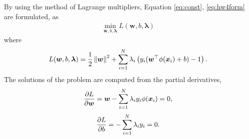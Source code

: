 \documentclass[journal,onecolumn,12pt]{IEEEtran}
\newcommand{\norm}[1]{\left\lVert#1\right\rVert}
\begin{document}
By using the method of Lagrange multipliers, Equation \ref{eq:const}, \ref{eq:hw4form} are formulated, as
\begin{equation}
\begin{aligned}
\min_{\boldsymbol{w}, b, \boldsymbol{\lambda}} L (\boldsymbol{w}, b, \boldsymbol{\lambda})
\end{aligned}
\end{equation}
where
\begin{equation}
\begin{aligned}
L (\boldsymbol{w}, b, \boldsymbol{\lambda}) = {1 \over 2} \norm{\boldsymbol{w}}^2 + \sum_{i=1}^{N} \lambda_i \left({y_i (\boldsymbol{w}^\top {\phi} (\boldsymbol{x}_i) + b)} - 1\right).
\end{aligned}
\end{equation}
The solutions of the problem are computed from the partial derivatives,
\begin{equation}
\begin{aligned}
{{\partial L}\over{\partial \boldsymbol{w}}} = \boldsymbol{w} - \sum_{i=1}^{N} \lambda_i y_i {\phi} (\boldsymbol{x}_i) = 0,
\end{aligned}
\label{eq:con1}
\end{equation}
\begin{equation}
\begin{aligned}
{{\partial L}\over{\partial b}} = - \sum_{i=1}^{N} \lambda_i y_i = 0.
\end{aligned}
\label{eq:con2}
\end{equation}
\end{document}

